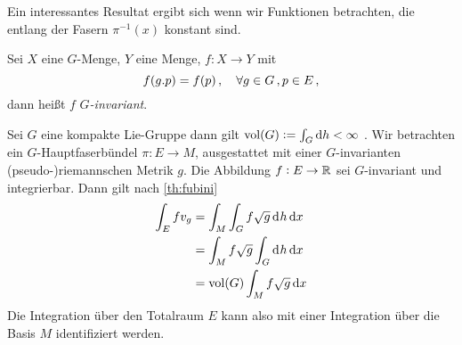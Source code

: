 Ein interessantes Resultat ergibt sich wenn wir Funktionen betrachten, die
entlang der Fasern $\pi^{-1}(x)$ konstant sind.
\begin{definition}
Sei $X$ eine $G$-Menge, $Y$ eine Menge, $f:X\to Y$ mit
\begin{equation}
f(g. p)=f(p)\,,\quad \forall g\in G\,,p\in E\,,
\end{equation}
dann heißt $f$ \emph{$G$-invariant}.
\end{definition}
Sei $G$ eine kompakte Lie-Gruppe dann gilt $\vol(G):=\int_G\dif h<\infty$
.
Wir betrachten ein $G$-Hauptfaserbündel $\pi: E\to M$,
ausgestattet mit einer $G$-invarianten {(pseudo-)riemannschen} Metrik $g$.
Die Abbildung $f:E\to \mathbb{R}$ sei $G$-invariant und integrierbar. Dann gilt nach
\autoref{th:fubini}
\begin{equation}
\begin{split}
\int_E f v_g &=\int_{M}\int_{G}f\sqrt{g}\dif^{}h \dif x\\
&=\int_{M}f\sqrt{g}\int_{G}\dif^{}h \dif x\\
&=\vol(G)\int_{M}f\sqrt{g} \dif x\\
\end{split}
\end{equation}
Die Integration über den Totalraum $E$ kann also mit einer Integration über die
Basis $M$ identifiziert werden.
